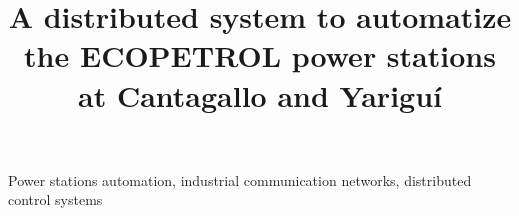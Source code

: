 \documentclass[10pt,conference,compsocconf]{IEEEtran}
\newcommand{\ecopetrol}{\textsf{ECOPETROL}\xspace}
\begin{document}
\title{A distributed system to automatize the \ecopetrol power stations at Cantagallo and Yariguí}

\author{%
\and
{}
\and
{}
}

\maketitle



\begin{IEEEkeywords}
Power stations automation, industrial communication networks, distributed control systems
\end{IEEEkeywords}

\IEEEpeerreviewmaketitle










\end{document}

